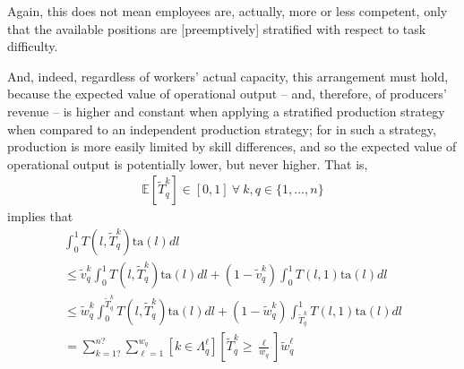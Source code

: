 \documentclass[hidelinks, nonatbib]{elsarticle}
\begin{document}
\begin{enumerate}
\begin{enumerate}
\begin{enumerate}
            Again, this does not mean employees are, actually, more or less competent, only that the available positions are [preemptively] stratified with respect to task difficulty. 

            And, indeed, regardless of workers' actual capacity, this arrangement must hold, because the expected value of operational output -- and, therefore, of producers' revenue -- is higher and constant when applying a stratified production strategy when compared to an independent production strategy; for in such a strategy, production is more easily limited by skill differences, and so the expected value of operational output is potentially lower, but never higher. That is, 
            \begin{gather}
                \mathbb{E}[
                    \tilde{T}_{q}^{k}
                ]
                \in [0,1]
                \
                \forall
                \
                k,q \in \{1, \dots, n\}
            \end{gather}
            implies that
            \begin{align}
                \int_{0}^{1}{
                    T(l,\tilde{T}_{q}^{k})
                    \text{ta}(l)
                    dl
                } 
                \\
                \leq
                \tilde{v}_{q}^{k}
                \int_{0}^{1}{
                    T(l,\tilde{T}_{q}^{k})
                    \text{ta}(l)
                    dl
                }
                +
                (1 - \tilde{v}_{q}^{k})
                \int_{0}^{1}{
                    T(l,1)
                    \text{ta}(l)
                    dl
                } 
                \\
                \leq
                \tilde{w}_{q}^{k}
                \int_{0}^{\tilde{T}_{q}^{k}}{
                    T(l,\tilde{T}_{q}^{k})
                    \text{ta}(l)
                    dl
                } + 
                (1 - \tilde{w}_{q}^{k})
                \int_{\tilde{T}_{q}^{k}}^{1}{
                    T(l,1)
                    \text{ta}(l)
                    dl
                }
                \\
                =
                \sum_{k=1?}^{n?}
                \sum_{\ell=1}^{w_q}
                \left[
                    k \in \Lambda_{q}^{\ell}
                \right]
                \left[
                    \tilde{T}_{q}^{k}
                    \geq 
                    \frac{\ell}{w_q}
                \right]
                \tilde{w}_{q}^{\ell}

\end{align}
\end{enumerate}
\end{enumerate}
\end{enumerate}
\end{document}
